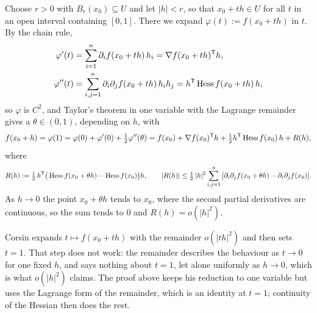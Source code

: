 \begin{exercisesolution}
Choose $r > 0$ with $B_r(x_0) \subseteq U$ and let $|h| < r$, so that $x_0 + th \in U$ for all
$t$ in an open interval containing $[0,1]$. There we expand $\varphi(t) := f(x_0+th)$ in $t$. By
the chain rule,
\begin{align*}
  \varphi'(t) &= \sum_{i=1}^{n}\partial_i f(x_0+th)\,h_i = \nabla f(x_0+th)^{\mathsf{T}} h, \\
  \varphi''(t) &= \sum_{i,j=1}^{n}\partial_i\partial_j f(x_0+th)\,h_ih_j
    = h^{\mathsf{T}}\operatorname{Hess} f(x_0+th)\,h,
\end{align*}
so $\varphi$ is $C^2$, and Taylor's theorem in one variable with the Lagrange remainder gives a
$\theta \in (0,1)$, depending on $h$, with
\[f(x_0+h) = \varphi(1) = \varphi(0) + \varphi'(0) + \tfrac12\varphi''(\theta)
  = f(x_0) + \nabla f(x_0)^{\mathsf{T}} h + \tfrac12 h^{\mathsf{T}}\operatorname{Hess} f(x_0)\,h + R(h),\]
where
\[R(h) := \tfrac12\,h^{\mathsf{T}}\big(\operatorname{Hess} f(x_0+\theta h) - \operatorname{Hess} f(x_0)\big)h, \qquad
  |R(h)| \leq \tfrac12\,|h|^2\sum_{i,j=1}^{n}
    \big|\partial_i\partial_jf(x_0+\theta h) - \partial_i\partial_jf(x_0)\big|.\]
As $h \to 0$ the point $x_0 + \theta h$ tends to $x_0$, where the second partial derivatives are
continuous, so the sum tends to $0$ and $R(h) = o(|h|^2)$.
\end{exercisesolution}

\begin{ainote}
Corsin expands $t \mapsto f(x_0+th)$ with the remainder $o(|th|^2)$ and then sets $t = 1$. That
step does not work: the remainder describes the behaviour as $t \to 0$ for one fixed $h$, and
says nothing about $t = 1$, let alone uniformly as $h \to 0$, which is what $o(|h|^2)$ claims.
The proof above keeps his reduction to one variable but uses the Lagrange form of the remainder,
which is an identity at $t = 1$; continuity of the Hessian then does the rest.
\end{ainote}




